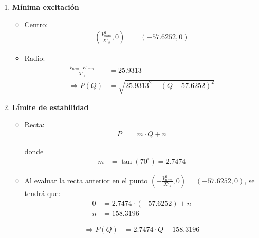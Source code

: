 \documentclass[
  11pt,
  letterpaper,
   addpoints,
   answers
  ]{exam}
\begin{document}
\begin{questions}
\begin{solution}
\begin{enumerate}
            \item \textbf{Mínima excitación}
            \begin{itemize}
                \item Centro:
                \begin{align}
                \left( \frac{V_{\text{nom}}^2}{X'_s}, 0 \right) &= (-57.6252, 0)
                \end{align}
        
                \item Radio:
                \begin{align}
                \frac{V_{\text{nom}} \cdot E'_{\text{min}}}{X'_s} &= 25.9313 \\
                \Rightarrow P(Q) &= \sqrt{25.9313^2 - (Q + 57.6252)^2}
                \end{align}
            \end{itemize}
        
            \item \textbf{Límite de estabilidad}
            \begin{itemize}
                \item Recta:
                \begin{align}
                P &= m \cdot Q + n
                \end{align}
                
                donde
                \begin{align}
                m &= \tan(70^\circ) = 2.7474
                \end{align}
        
                \item Al evaluar la recta anterior en el punto \( \left( -\frac{V_{\text{nom}}^2}{X'_s}, 0 \right) = (-57.6252, 0) \), se tendrá que:
                \begin{align}
                0 &= 2.7474 \cdot (-57.6252) + n \\
                n &= 158.3196
                \end{align}
                
                \begin{align}
                \Rightarrow P(Q) &= 2.7474 \cdot Q + 158.3196
                \end{align}
            \end{itemize}
        \end{enumerate}
        

\end{solution}
\end{questions}
\end{document}
